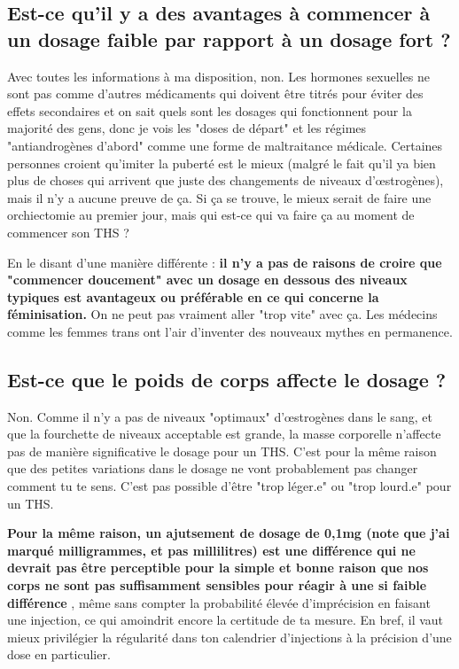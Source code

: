 \documentclass{article}
\begin{document}
\subsection{Est-ce qu'il y a des avantages à commencer à un dosage faible par rapport à un dosage fort ?}

Avec toutes les informations à ma disposition, non. Les hormones sexuelles ne sont pas comme d'autres médicaments qui doivent être titrés pour éviter des effets secondaires et on sait quels sont les dosages qui fonctionnent pour la majorité des gens, donc je vois les "doses de départ" et les régimes "antiandrogènes d'abord" comme une forme de maltraitance médicale. Certaines personnes croient qu'imiter la puberté est le mieux (malgré le fait qu'il ya bien plus de choses qui arrivent que juste des changements de niveaux d'œstrogènes), mais il n'y a aucune preuve de ça. Si ça se trouve, le mieux serait de faire une orchiectomie au premier jour, mais qui est-ce qui va faire ça au moment de commencer son THS ? 

En le disant d'une manière différente : \textbf{il n'y a pas de raisons de croire que "commencer doucement" avec un dosage en dessous des niveaux typiques est avantageux ou préférable en ce qui concerne la féminisation.} On ne peut pas vraiment aller "trop vite" avec ça. Les médecins comme les femmes trans ont l'air d'inventer des nouveaux mythes en permanence. 

\subsection{Est-ce que le poids de corps affecte le dosage ?}

Non. Comme il n'y a pas de niveaux "optimaux" d'œstrogènes dans le sang, et que la fourchette de niveaux acceptable est grande, la masse corporelle n'affecte pas de manière significative le dosage pour un THS. C'est pour la même raison que des petites variations dans le dosage ne vont probablement pas changer comment tu te sens. C'est pas possible d'être "trop léger.e" ou "trop lourd.e" pour un THS.

\textbf{Pour la même raison, un ajutsement de dosage de 0,1mg (note que j'ai marqué milligrammes, et pas millilitres) est une différence qui ne devrait pas être perceptible pour la simple et bonne raison que nos corps ne sont pas suffisamment sensibles pour réagir à une si faible différence} , même sans compter la probabilité élevée d'imprécision en faisant une injection, ce qui amoindrit encore la certitude de ta mesure. En bref, il vaut mieux privilégier la régularité dans ton calendrier d'injections à la précision d'une dose en particulier.
\end{document}
